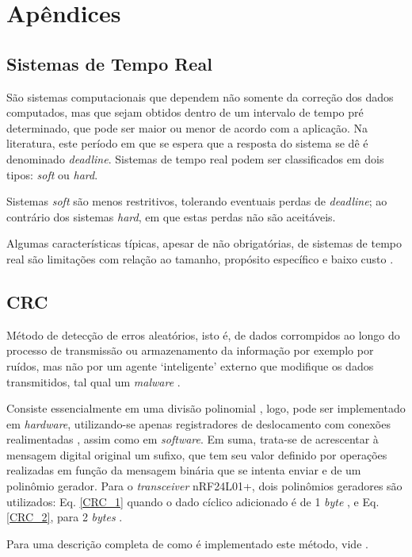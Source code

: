 \chapter{Apêndices}

\section{Sistemas de Tempo Real}
São sistemas computacionais que dependem não somente da correção dos dados computados, mas que sejam obtidos dentro de um intervalo 
de tempo 
pré determinado, que pode ser maior ou menor de acordo com a aplicação.
Na literatura, este período em que se espera que a resposta do sistema se dê é denominado \textit{deadline}.
Sistemas de tempo real podem ser classificados em dois tipos: \textit{soft} ou \textit{hard}.

Sistemas \textit{soft} são menos restritivos, tolerando eventuais perdas de \textit{deadline}; 
ao contrário dos sistemas \textit{hard}, em que estas perdas não são aceitáveis.  

Algumas características típicas, apesar de não obrigatórias, de sistemas de tempo real são limitações com relação ao tamanho, propósito específico e 
baixo custo \cite{silberschatz}.

\section{CRC}
Método de detecção de erros aleatórios, isto é, de dados corrompidos ao longo do processo de transmissão ou armazenamento da informação por exemplo 
por ruídos, mas não por um agente \textquoteleft inteligente\textquoteright{} externo que modifique os dados transmitidos, tal qual um 
\textit{malware} \cite{stigge}.

Consiste essencialmente em uma divisão polinomial \cite{stigge}, logo, pode ser implementado em \textit{hardware}, utilizando-se apenas registradores 
de deslocamento com conexões realimentadas \cite{peterson}, assim como em \textit{software}. 
Em suma, trata-se de acrescentar à mensagem digital original um sufixo, que tem seu valor definido por operações realizadas em função da mensagem 
binária que se intenta enviar e de um polinômio gerador.
Para o \textit{transceiver} nRF24L01+, dois polinômios geradores são utilizados: Eq. \ref{CRC_1} quando o dado cíclico adicionado é de 1 
\textit{byte} , e Eq. \ref{CRC_2}, para 2 \textit{bytes} \cite{nRF}.

Para uma descrição completa de como é implementado este método, vide .

